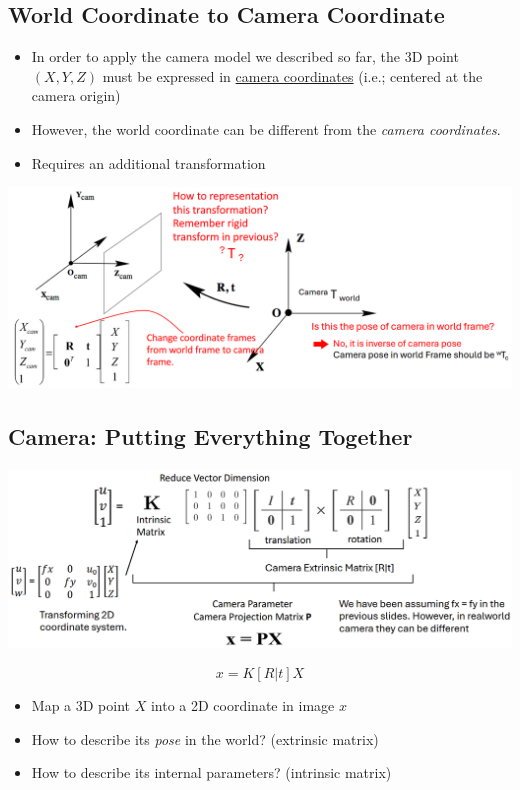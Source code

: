 \documentclass[10pt]{article}
\begin{document}
\subsection*{World Coordinate to Camera Coordinate}
\begin{itemize}
	\item In order to apply the camera model we described so far, the 3D point $(X, Y, Z)$ must be expressed in \underline{camera coordinates} (i.e.; centered at the camera origin)
	\item However, the world coordinate can be different from the \textit{camera coordinates}.
	\item Requires an additional transformation
\end{itemize}
\begin{center} 
	\includegraphics*[width=\textwidth]{L1_31.png} 
\end{center}

\subsection*{Camera: Putting Everything Together}
\begin{center} 
	\includegraphics*[width=\textwidth]{L1_32.png} 
\end{center}
\[x = K[R|t]X\]
\begin{itemize}
	\item Map a 3D point $X$ into a 2D coordinate in image $x$
	\item How to describe its \textit{pose} in the world?  (extrinsic matrix)
	\item How to describe its internal parameters?  (intrinsic matrix)
\end{itemize}
\end{document}
